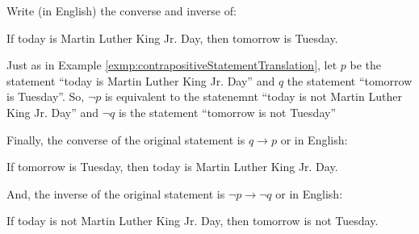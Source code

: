 \guard






\begin{exmp}
\label{exmp:converseInverseStatementTranslation}
  Write (in English) the converse and inverse of:
  \begin{center}
      If today is Martin Luther King Jr. Day, then tomorrow is Tuesday.
  \end{center}

  Just as in Example \ref{exmp:contrapositiveStatementTranslation}, let $p$ be the statement ``today is Martin Luther King Jr. Day'' and $q$ the statement ``tomorrow is Tuesday''.
  So, $\neg p$ is equivalent to the statenemnt ``today is not Martin Luther King Jr. Day'' and $\neg q$ is the statement ``tomorrow is not Tuesday''

  Finally, the converse of the original statement is $q \rightarrow p$ or in English:
  \begin{center}
      If tomorrow is Tuesday, then today is Martin Luther King Jr. Day.
  \end{center}
  And, the inverse of the original statement is $\neg p \rightarrow \neg q$ or in English:
  \begin{center}
      If today is not Martin Luther King Jr. Day, then tomorrow is not Tuesday.
  \end{center}
\end{exmp}
